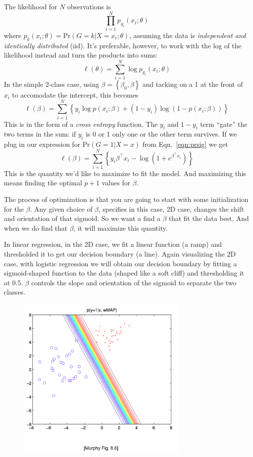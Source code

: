 \documentclass[a4paper]{article}
\begin{document}
The likelihood for $N$ observations is
$$\prod_{i=1}^N p_{g_i}(x_i;\theta)$$
where $p_k(x_i;\theta)=\text{Pr}(G=k|X=x_i;\theta)$, assuming the data is \emph{independent and identically distributed} (iid).  It's preferable, however, to work with the log of the likelihood instead and turn the products into sums:
$$
\ell(\theta) = \sum_{i=1}^N \log p_{g_i}(x_i;\theta)
$$
In the simple 2-class case, using $\beta=\left\{\beta_{0},\beta\right\}$ and tacking on a 1 at the front of $x_i$ to accomodate the intercept, this becomes
$$
\ell(\beta) = \sum_{i=1}^N \left\{ y_i\log p(x_i;\beta) + (1-y_i)\log\left(1-p(x_i;\beta)\right)\right\}
$$
This is in the form of a \emph{cross entropy} function.  The $y_i$ and $1-y_i$ term ``gate'' the two terms in the sum: if $y_i$ is 0 or 1 only one or the other term survives.  If we plug in our expression for $\text{Pr}(G=1|X=x)$ from Eqn.\ \ref{eqn:prsig} we get
$$
\ell(\beta) = \sum_{i=1}^N \left\{ y_i\beta^\top x_i - \log\left(1+e^{\beta^\top x_i}\right) \right\}
$$
This is the quantity we'd like to maximize to fit the model.  And maximizing this means finding the optimal $p+1$ values for $\beta$.

The process of optimization is that you are going to start with some initialization for the  $\beta$. Any given choice of $\beta$, specifies in this case, 2D case, changes the shift and orientation of that sigmoid. So we want a find a $\beta$ that fit the data best. And when we do find that $\beta$, it will maximize this quantity.   

In linear regression, in the 2D case, we fit a linear function (a ramp) and thresholded it to get our decision boundary (a line).  Again visualizing the 2D case, with logistic regression we will obtain our decision boundary by fitting a sigmoid-shaped function to the data (shaped like a soft cliff) and thresholding it at 0.5.  $\beta$ controls the slope and orientation of the sigmoid to separate the two classes.

\begin{figure}
\centering
\includegraphics[width=0.75\textwidth]{murphy_fig8_6.png}
\end{figure}
\end{document}
